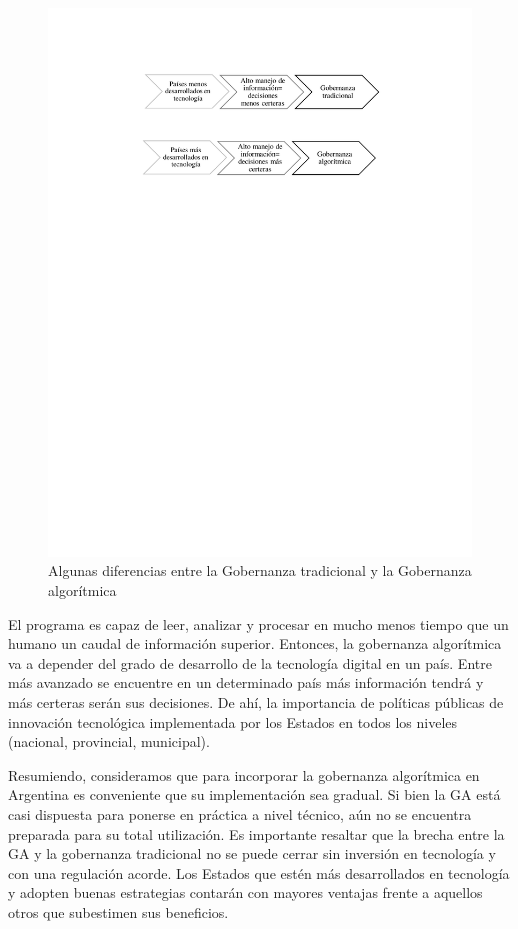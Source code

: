 \documentclass[12pt]{report} %
\begin{document}
\begin{itemize}
\begin{figure}
\centering
\includegraphics[width=0.85\columnwidth]{imagenes/dosflechas.pdf}
\caption{ Algunas diferencias entre la Gobernanza tradicional y la Gobernanza algorítmica}
\label{dosflechas}
\end{figure} 

El programa es capaz de leer, analizar y procesar en mucho menos tiempo que un humano un caudal de información superior. Entonces, la gobernanza algorítmica va a depender del grado de desarrollo de la tecnología digital en un país. Entre más avanzado se encuentre en un determinado país más información tendrá y más certeras serán sus decisiones. De ahí, la importancia de políticas públicas de innovación tecnológica implementada por los Estados en todos los niveles (nacional, provincial, municipal). 

Resumiendo, consideramos que para incorporar la gobernanza algorítmica en Argentina es conveniente que su implementación sea gradual. Si bien la GA está casi dispuesta para ponerse en práctica a nivel técnico, aún no se encuentra preparada para su total utilización. Es importante resaltar que la brecha entre la GA y la gobernanza tradicional no se puede cerrar sin inversión en tecnología y con una regulación acorde. Los Estados que estén más desarrollados en tecnología y adopten buenas estrategias contarán con mayores ventajas frente a aquellos otros que subestimen sus beneficios.




\end{itemize}
\end{document}
